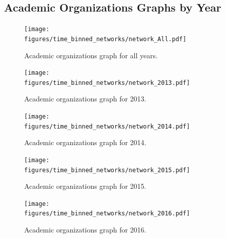 \documentclass[notitlepage,aps,prd,nofootinbib]{revtex4-1}
\newcommand{\figures}{../outputs/plots}
\newcommand{\includedir}{../latex_files}
\begin{document}




\newpage %

\begin{appendices}


\section{Academic Organizations Graphs by Year}
\label{appendix:graphs_by_year}

\begin{figure}[!htb]\centering
  \texttt{[image: \\figures/time\_binned\_networks/network\_All.pdf]}
  \caption{Academic organizations graph for all years.}
\end{figure}

\vspace{-0.5cm}

\begin{figure}[!htb]\centering
  \texttt{[image: \\figures/time\_binned\_networks/network\_2013.pdf]}
  \caption{Academic organizations graph for 2013.}
\end{figure}

\begin{figure}[!htb]\centering
  \texttt{[image: \\figures/time\_binned\_networks/network\_2014.pdf]}
  \caption{Academic organizations graph for 2014.}
\end{figure}

\begin{figure}[!htb]\centering
  \texttt{[image: \\figures/time\_binned\_networks/network\_2015.pdf]}
  \caption{Academic organizations graph for 2015.}
\end{figure}

\begin{figure}[!htb]\centering
  \texttt{[image: \\figures/time\_binned\_networks/network\_2016.pdf]}
  \caption{Academic organizations graph for 2016.}
\end{figure}


\end{appendices}
\end{document}
